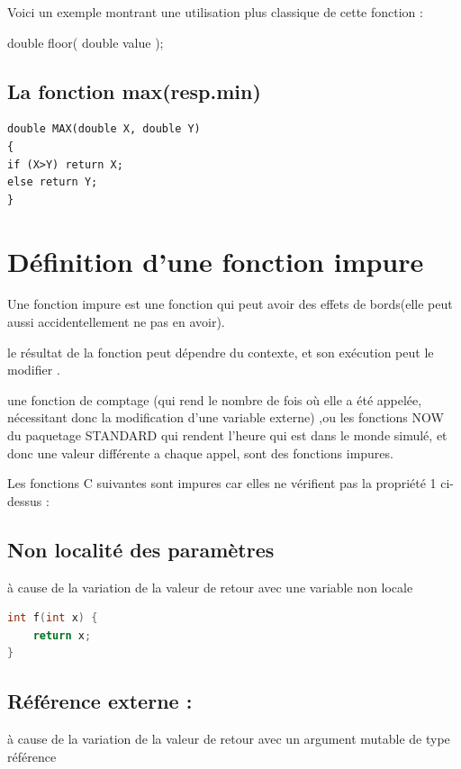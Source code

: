 \documentclass[12pt,titlepage]{article}
\begin{document}
Voici un exemple montrant une utilisation plus classique de cette fonction :

double      floor( double value );


\subsection{La fonction max(resp.min)}

\begin{lstlisting}
double MAX(double X, double Y)
{
if (X>Y) return X;
else return Y;
}
\end{lstlisting}

\section{Définition d’une fonction impure}

Une fonction impure est une fonction qui peut avoir des effets de bords(elle peut aussi accidentellement ne pas en avoir).

le résultat de la fonction peut dépendre du contexte, et son exécution peut le modifier .

une fonction de comptage (qui rend le nombre de fois où elle a été appelée, nécessitant donc la modification d’une variable externe) ,ou les fonctions NOW du paquetage STANDARD qui rendent l’heure qui est dans le monde simulé, et donc une valeur différente a chaque appel, sont des  fonctions impures.

Les fonctions C suivantes sont impures car elles ne vérifient pas la propriété 1 ci-dessus :

\subsection{Non localité des paramètres}

à cause de la variation de la valeur de retour avec une variable non locale

\begin{lstlisting}[language=c]
int f(int x) {
    return x;
}
\end{lstlisting}

\subsection{Référence externe :}

à cause de la variation de la valeur de retour avec un argument mutable de type référence
\end{document}
